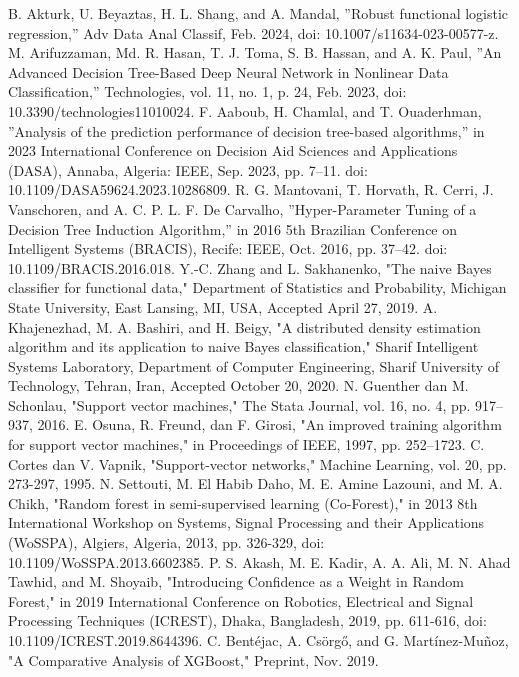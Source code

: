 \documentclass[conference]{IEEEtran}
\begin{document}
\begin{thebibliography}{00}
 B. Akturk, U. Beyaztas, H. L. Shang, and A. Mandal, ''Robust functional logistic regression,'' Adv Data Anal Classif, Feb. 2024, doi: 10.1007/s11634-023-00577-z.
 M. Arifuzzaman, Md. R. Hasan, T. J. Toma, S. B. Hassan, and A. K. Paul, ''An Advanced Decision Tree-Based Deep Neural Network in Nonlinear Data Classification,'' Technologies, vol. 11, no. 1, p. 24, Feb. 2023, doi: 10.3390/technologies11010024.
 F. Aaboub, H. Chamlal, and T. Ouaderhman, ''Analysis of the prediction performance of decision tree-based algorithms,'' in 2023 International Conference on Decision Aid Sciences and Applications (DASA), Annaba, Algeria: IEEE, Sep. 2023, pp. 7--11. doi: 10.1109/DASA59624.2023.10286809.
 R. G. Mantovani, T. Horvath, R. Cerri, J. Vanschoren, and A. C. P. L. F. De Carvalho, ''Hyper-Parameter Tuning of a Decision Tree Induction Algorithm,'' in 2016 5th Brazilian Conference on Intelligent Systems (BRACIS), Recife: IEEE, Oct. 2016, pp. 37--42. doi: 10.1109/BRACIS.2016.018.
 Y.-C. Zhang and L. Sakhanenko, "The naive Bayes classifier for functional data," Department of Statistics and Probability, Michigan State University, East Lansing, MI, USA, Accepted April 27, 2019.
 A. Khajenezhad, M. A. Bashiri, and H. Beigy, "A distributed density estimation algorithm and its application to naive Bayes classification," Sharif Intelligent Systems Laboratory, Department of Computer Engineering, Sharif University of Technology, Tehran, Iran, Accepted October 20, 2020.
 N. Guenther dan M. Schonlau, "Support vector machines," The Stata Journal, vol. 16, no. 4, pp. 917--937, 2016.
 E. Osuna, R. Freund, dan F. Girosi, "An improved training algorithm for support vector machines," in Proceedings of IEEE, 1997, pp. 252--1723.
 C. Cortes dan V. Vapnik, "Support-vector networks," Machine Learning, vol. 20, pp. 273-297, 1995.
 N. Settouti, M. El Habib Daho, M. E. Amine Lazouni, and M. A. Chikh, "Random forest in semi-supervised learning (Co-Forest)," in 2013 8th International Workshop on Systems, Signal Processing and their Applications (WoSSPA), Algiers, Algeria, 2013, pp. 326-329, doi: 10.1109/WoSSPA.2013.6602385.
 P. S. Akash, M. E. Kadir, A. A. Ali, M. N. Ahad Tawhid, and M. Shoyaib, "Introducing Confidence as a Weight in Random Forest," in 2019 International Conference on Robotics, Electrical and Signal Processing Techniques (ICREST), Dhaka, Bangladesh, 2019, pp. 611-616, doi: 10.1109/ICREST.2019.8644396.
 C. Bentéjac, A. Csörgő, and G. Martínez-Muñoz, "A Comparative Analysis of XGBoost," Preprint, Nov. 2019.

\end{thebibliography}
\end{document}
